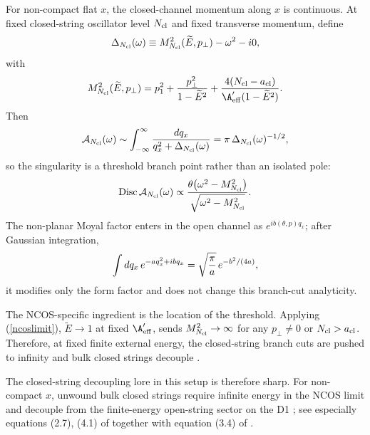 \documentclass[12pt]{article}
\begin{document}
For non-compact flat $x$, the closed-channel momentum along $x$ is continuous. At fixed closed-string oscillator level $N_{\rm cl}$ and fixed transverse momentum, define
\[
\Delta_{N_{\rm cl}}(\omega)\equiv M_{N_{\rm cl}}^2(\widetilde E,p_\perp)-\omega^2-i0,
\]
with
\[
M_{N_{\rm cl}}^2(\widetilde E,p_\perp)
=p_1^2+{p_\perp^2\over 1-\widetilde E^2}
 +{4(N_{\rm cl}-a_{\rm cl})\over \A'_{\rm eff}(1-\widetilde E^2)}.
\]
Then
\[
\mathcal A_{N_{\rm cl}}(\omega)\sim
\int_{-\infty}^{\infty}{dq_x\over q_x^2+\Delta_{N_{\rm cl}}(\omega)}
=\pi\,\Delta_{N_{\rm cl}}(\omega)^{-1/2},
\]
so the singularity is a threshold branch point rather than an isolated pole:
\[
{\rm Disc}\,\mathcal A_{N_{\rm cl}}(\omega)\propto
{\theta\!\left(\omega^2-M_{N_{\rm cl}}^2\right)\over
\sqrt{\omega^2-M_{N_{\rm cl}}^2}}.
\]
The non-planar Moyal factor enters in the open channel as $e^{ib(\theta,p)q_x}$; after Gaussian integration,
\[
\int dq_x\,e^{-a q_x^2+ibq_x}=\sqrt{\pi\over a}\,e^{-b^2/(4a)},
\]
it modifies only the form factor and does not change this branch-cut analyticity.

The NCOS-specific ingredient is the location of the threshold. Applying (\ref{ncoslimit}), $\widetilde E\to1$ at fixed $\A'_{\rm eff}$, sends $M_{N_{\rm cl}}^2\to\infty$ for any $p_\perp\neq0$ or $N_{\rm cl}>a_{\rm cl}$. Therefore, at fixed finite external energy, the closed-string branch cuts are pushed to infinity and bulk closed strings decouple \cite{seiberg2000stringsbackgroundelectricfield,bassetto2003oneloopunitaritystringtheories}.

The closed-string decoupling lore in this setup is therefore sharp. For non-compact $x$, unwound bulk closed strings require infinite energy in the NCOS limit and decouple from the finite-energy open-string sector on the D1 \cite{seiberg2000stringsbackgroundelectricfield,gopakumar2000sdualitynoncommutativegaugetheory}; see especially equations (2.7), (4.1) of \cite{seiberg2000stringsbackgroundelectricfield} together with equation (3.4) of \cite{gopakumar2000sdualitynoncommutativegaugetheory}.
\end{document}
